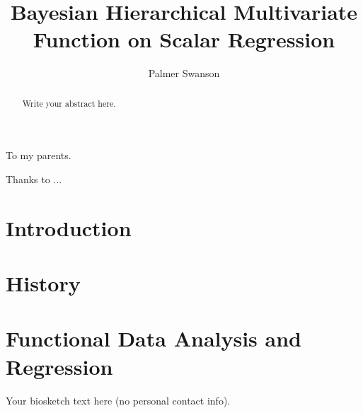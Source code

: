 \documentclass[11pt,expanded,copyright]{template/fsuthesis}
\title{Bayesian Hierarchical Multivariate Function on Scalar Regression}
\author{Palmer Swanson}
\begin{document}
\frontmatter
\maketitle
\makecommitteepage

\begin{dedication}\centering To my parents.\end{dedication}
\begin{acknowledgments}Thanks to ...\end{acknowledgments}

\tableofcontents
\listoftables
\listoffigures

\begin{abstract}
Write your abstract here.
\end{abstract}

\mainmatter

\chapter{Introduction}
  

\chapter{History}
  

\chapter{Functional Data Analysis and Regression}


\renewcommand*{\bibname}{References}
\printbibliography

\begin{biosketch}
Your biosketch text here (no personal contact info).
\end{biosketch}
\end{document}
